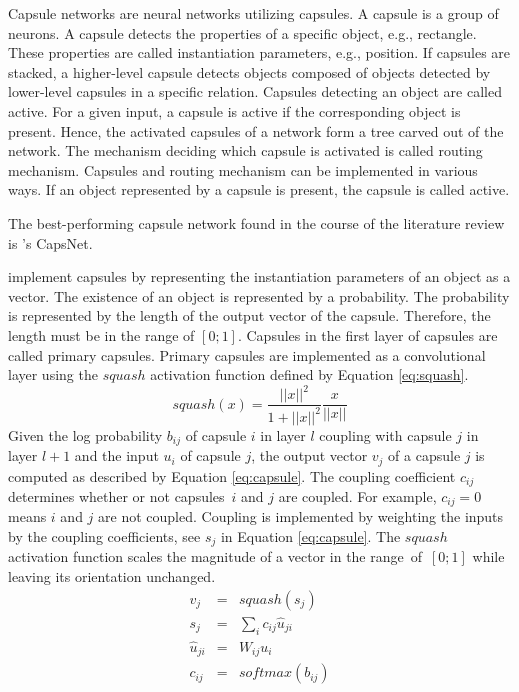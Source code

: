 Capsule networks are neural networks utilizing capsules. A capsule is a group of neurons. A capsule detects the properties of a specific object, e.g., rectangle. These properties are called instantiation parameters, e.g., position. If capsules are stacked, a higher-level capsule detects objects composed of objects detected by lower-level capsules in a specific relation. Capsules detecting an object are called active. For a given input, a capsule is active if the corresponding object is present. Hence, the activated capsules of a network form a tree carved out of the network. The mechanism deciding which capsule is activated is called routing mechanism.
Capsules and routing mechanism can be implemented in various ways. If an object represented by a capsule is present, the capsule is called active. \autocite{Sabour.2017}
\par
The best-performing capsule network found in the course of the literature review is \cite{Sabour.2017}'s CapsNet. \autocite{Sabour.2017}
\par
\cite{Sabour.2017} implement capsules by representing the instantiation parameters of an object as a vector. The existence of an object is represented by a probability. The probability is represented by the length of the output vector of the capsule. Therefore, the length must be in the range of $[0;1]$. \autocite{Sabour.2017}
%
Capsules in the first layer of capsules are called primary capsules. Primary capsules are implemented as a convolutional layer using the $squash$ activation function defined by Equation \eqref{eq:squash}. \autocite{Sabour.2017}
\begin{equation}
	\label{eq:squash}
	squash(x) = \frac{||x||^2}{1+||x||^2} \frac{x}{||x||}
\end{equation}
Given the log probability $b_{ij}$ of capsule $i$ in layer $l$ coupling with capsule $j$ in layer $l+1$ and the input $u_i$ of capsule $j$, the output vector $v_j$ of a capsule $j$ is computed as described by Equation \eqref{eq:capsule}. The coupling coefficient $c_{ij}$ determines whether or not capsules~$i$ and $j$ are coupled. For example, $c_{ij}=0$ means $i$ and $j$ are not coupled. Coupling is implemented by weighting the inputs by the coupling coefficients, see $s_j$ in Equation \eqref{eq:capsule}. The $squash$ activation function scales the magnitude of a vector in the range~of~$[0;1]$ while leaving its orientation unchanged. \autocite{Sabour.2017}
\begin{equation}
	\label{eq:capsule}
	\begin{array}{lcl}
		v_j & = & squash(s_j)\\
		s_j & = & \sum_{i} c_{ij} \hat{u}_{ji}\\
		\hat{u}_{ji} & = & W_{ij} u_i\\
		c_{ij} & = & softmax(b_{ij})
	\end{array}
\end{equation}

